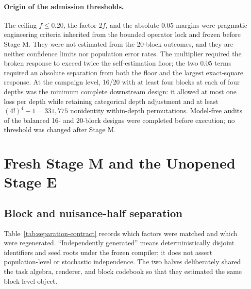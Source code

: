 \documentclass[10pt,a4paper]{article}
\begin{document}
\paragraph{Origin of the admission thresholds.}
The ceiling $f\leq0.20$, the factor $2f$, and the absolute 0.05 margins were pragmatic engineering criteria inherited from the bounded operator lock and frozen before Stage M. They were not estimated from the 20-block outcomes, and they are neither confidence limits nor population error rates. The multiplier required the broken response to exceed twice the self-estimation floor; the two 0.05 terms required an absolute separation from both the floor and the largest exact-square response. At the campaign level, 16/20 with at least four blocks at each of four depths was the minimum complete downstream design: it allowed at most one loss per depth while retaining categorical depth adjustment and at least $(4!)^4-1=331{,}775$ nonidentity within-depth permutations. Model-free audits of the balanced 16- and 20-block designs were completed before execution; no threshold was changed after Stage M.

\section{Fresh Stage M and the Unopened Stage E}
\label{app:stage-m}

\subsection{Block and nuisance-half separation}

Table~\ref{tab:separation-contract} records which factors were matched and which were regenerated. ``Independently generated'' means deterministically disjoint identifiers and seed roots under the frozen compiler; it does not assert population-level or stochastic independence. The two halves deliberately shared the task algebra, renderer, and block codebook so that they estimated the same block-level object.
\end{document}
